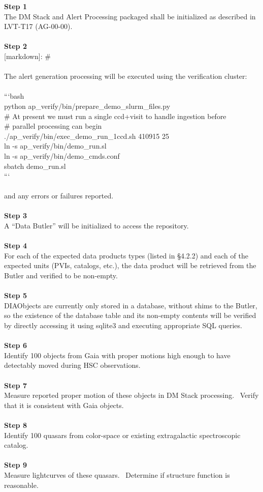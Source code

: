 \textbf{Step 1}\\
The DM Stack and Alert Processing packaged shall be initialized as
described in LVT-T17 (AG-00-00).\\
~\\
\textbf{Step 2}\\
{[}markdown{]}: \#\\
~\\
The alert generation processing will be executed using the verification
cluster:\\
~\\
```bash\\
python ap\_verify/bin/prepare\_demo\_slurm\_files.py\\
\# At present we must run a single ccd+visit to handle ingestion
before\\
\# parallel processing can begin\\
./ap\_verify/bin/exec\_demo\_run\_1ccd.sh 410915 25\\
ln -s ap\_verify/bin/demo\_run.sl\\
ln -s ap\_verify/bin/demo\_cmds.conf\\
sbatch demo\_run.sl\\
```\\
~\\
and any errors or failures reported.\\
~\\
\textbf{Step 3}\\
A ``Data Butler'' will be initialized to access the repository.\\
~\\
\textbf{Step 4}\\
For each of the expected data products types (listed in §4.2.2) and each
of the expected units (PVIs, catalogs, etc.), the data product will be
retrieved from the Butler and verified to be non-empty.\\
~\\
\textbf{Step 5}\\
DIAObjects are currently only stored in a database, without shims to the
Butler, so the existence of the database table and its non-empty
contents will be verified by directly accessing it using sqlite3 and
executing appropriate SQL queries.\\
~\\
\textbf{Step 6}\\
Identify 100 objects from Gaia with proper motions high enough to have
detectably moved during HSC observations.\\
~\\
\textbf{Step 7}\\
Measure reported proper motion of these objects in DM Stack processing.
~Verify that it is consistent with Gaia objects.\\
~\\
\textbf{Step 8}\\
Identify 100 quasars from color-space or existing extragalactic
spectroscopic catalog.\\
~\\
\textbf{Step 9}\\
Measure lightcurves of these quasars. ~Determine if structure function
is reasonable.\\
~\\

